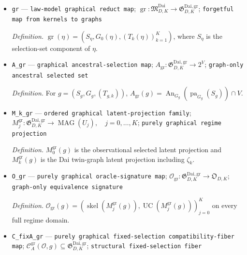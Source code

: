 \documentclass{article}
\begin{document}
\begin{itemize}
  \par\smallskip\noindent\emph{Definition.} \(\mathfrak G_{D,K}^{\mathrm{Dai,gr}}\) is the graph-and-target-only Dai class defined in \(\mathrm{def:graphical\mbox{-}dai\mbox{-}specifications}\); it contains no probability kernels.
  \item \texttt{gr} --- \texttt{law-\allowbreak{}model graphical reduct map}; \(\operatorname{gr}:\mathfrak M_{D,K}^{\mathrm{Dai}}\to\mathfrak G_{D,K}^{\mathrm{Dai,gr}}\); \texttt{forgetful map from kernels to graphs}
  \par\smallskip\noindent\emph{Definition.} \(\operatorname{gr}(\eta)=(S_\eta,G_0(\eta),(T_k(\eta))_{k=1}^{K})\), where \(S_\eta\) is the selection-set component of \(\eta\).
  \item \texttt{A\_\allowbreak{}gr} --- \texttt{graphical ancestral-\allowbreak{}selection map}; \(A_{\mathrm{gr}}:\mathfrak G_{D,K}^{\mathrm{Dai,gr}}\to2^V\); \texttt{graph-\allowbreak{}only ancestral selected set}
  \par\smallskip\noindent\emph{Definition.} For \(g=(S_g,G_g,(T_{g,k}))\), \(A_{\mathrm{gr}}(g)=\operatorname{An}_{G_g}(\operatorname{pa}_{G_g}(S_g))\cap V\).
  \item \texttt{M\_\allowbreak{}k\_\allowbreak{}gr} --- \texttt{ordered graphical latent-\allowbreak{}projection family}; \(M_j^{\mathrm{gr}}:\mathfrak G_{D,K}^{\mathrm{Dai,gr}}\to\operatorname{MAG}(U_j),\quad j=0,\ldots,K\); \texttt{purely graphical regime projection}
  \par\smallskip\noindent\emph{Definition.} \(M_0^{\mathrm{gr}}(g)\) is the observational selected latent projection and \(M_k^{\mathrm{gr}}(g)\) is the Dai twin-graph latent projection including \(\zeta_k\).
  \item \texttt{O\_\allowbreak{}gr} --- \texttt{purely graphical oracle-\allowbreak{}signature map}; \(\mathcal O_{\mathrm{gr}}:\mathfrak G_{D,K}^{\mathrm{Dai,gr}}\to\mathfrak O_{D,K}\); \texttt{graph-\allowbreak{}only equivalence signature}
  \par\smallskip\noindent\emph{Definition.} \(\mathcal O_{\mathrm{gr}}(g)=(\operatorname{skel}(M_j^{\mathrm{gr}}(g)),\operatorname{UC}(M_j^{\mathrm{gr}}(g)))_{j=0}^{K}\) on every full regime domain.
  \item \texttt{C\_\allowbreak{}fixA\_\allowbreak{}gr} --- \texttt{purely graphical fixed-\allowbreak{}selection compatibility-\allowbreak{}fiber map}; \(\mathcal C_A^{\mathrm{gr}}(\mathcal O,g)\subseteq\mathfrak G_{D,K}^{\mathrm{Dai,gr}}\); \texttt{structural fixed-\allowbreak{}selection fiber}

\end{itemize}
\end{document}
